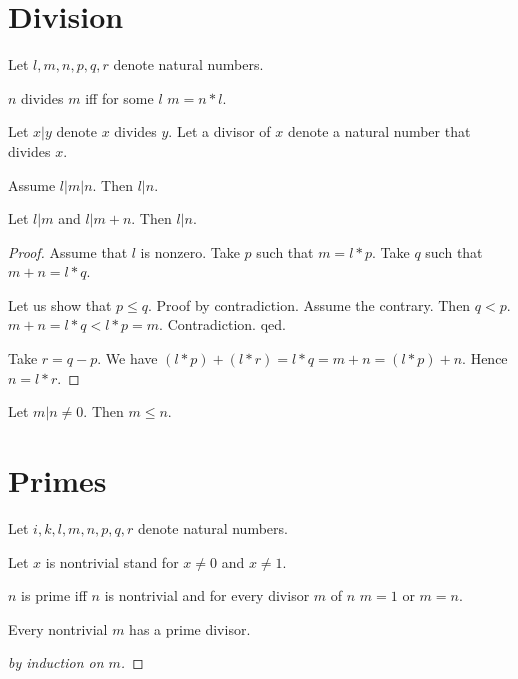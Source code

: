 \documentclass[11pt]{article}
\begin{document}
\section{Division}

\begin{forthel}
Let $l,m,n,p,q,r$ denote natural numbers.

\begin{definition}
$n$ divides $m$ iff for some $l$ $m = n * l$.
\end{definition}

Let $x | y$ denote $x$ divides $y$.
Let a divisor of $x$ denote a natural number that divides $x$.

\begin{lemma}
Assume $l | m | n$.
Then $l | n$.
\end{lemma}

\begin{lemma}
Let $l | m$ and $l | m + n$.
Then $l | n$.
\end{lemma}
\begin{proof}
Assume that $l$ is nonzero.
Take $p$ such that $m = l * p$.
Take $q$ such that $m + n = l * q$.

Let us show that
$p \leq q$.
Proof by contradiction.
Assume the contrary. Then $q < p$.
$m+n = l * q < l * p = m$.
Contradiction. qed.

Take $r = q - p$.
We have $(l * p) + (l * r) = l * q = m + n = (l * p) + n$.
Hence $n = l * r$.
\end{proof}

\begin{lemma}
Let $m | n \neq 0$.
Then $m \leq n$.
\end{lemma}

\end{forthel}


\section{Primes}

\begin{forthel}
Let $i,k,l,m,n,p,q,r$ denote natural numbers.

Let $x$ is nontrivial stand for $x \neq 0$ and $x \neq 1$.

\begin{definition}
$n$ is prime iff $n$ is nontrivial and
for every divisor $m$ of $n$ $m = 1$ or $m = n$.
\end{definition}

\begin{lemma}
Every nontrivial $m$ has a prime divisor.
\end{lemma}
\begin{proof}[by induction on $m$]
\end{proof}

\end{forthel}
\end{document}
